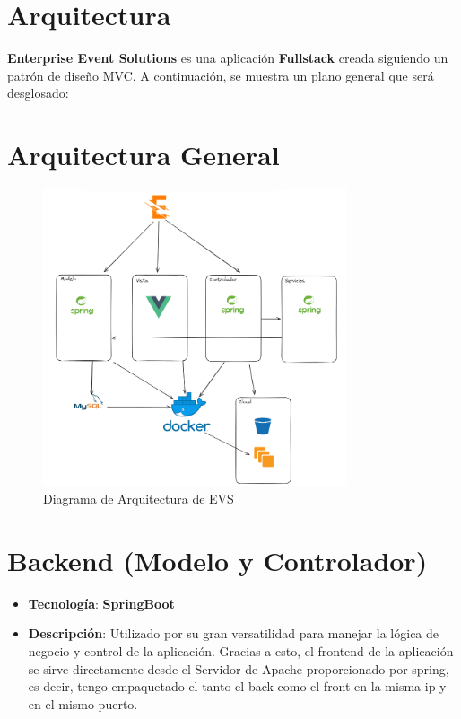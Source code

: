 \section{Arquitectura}
\textbf{Enterprise Event Solutions} es una aplicación \textbf{Fullstack} creada siguiendo un patrón de diseño MVC. A continuación, se muestra un plano general
que será desglosado:

\section*{Arquitectura General}
\begin{figure}[h]
    \centering
    \includegraphics[width=0.8\textwidth]{Arquitectura.png} 
    \caption{Diagrama de Arquitectura de EVS}
    \label{fig:mvc_architecture}
\end{figure}
\newpage

\section*{Backend (Modelo y Controlador)}

\begin{itemize}
    \item \textbf{Tecnología}: \textbf{SpringBoot}
    \item \textbf{Descripción}: Utilizado por su gran versatilidad para manejar la lógica de negocio y control de la aplicación. Gracias a esto, el frontend
    de la aplicación se sirve directamente desde el Servidor de Apache proporcionado por spring, es decir, tengo empaquetado el tanto el back como el front en la misma ip
    y en el mismo puerto.
\end{itemize}

